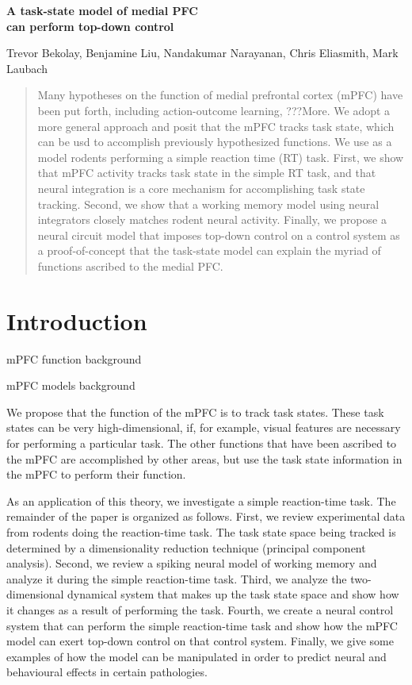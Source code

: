 \documentclass[12pt]{article}
\title{}
\date{}
\author{}
\begin{document}
\begin{center} \begin{Large}
  \textbf{A task-state model of medial PFC \\ can perform top-down
    control}
\end{Large} \end{center}

\begin{center}
  Trevor Bekolay, Benjamine Liu, Nandakumar Narayanan, Chris
  Eliasmith, Mark Laubach
\end{center}

\begin{abstract}
  Many hypotheses on the function of medial prefrontal cortex (mPFC)
  have been put forth,
  including action-outcome learning, ???More.
  We adopt a more general approach and posit that
  the mPFC tracks task state,
  which can be usd to accomplish previously hypothesized functions.
  We use as a model rodents performing a simple reaction time (RT) task.
  First, we show that mPFC activity
  tracks task state in the simple RT task,
  and that neural integration is a core mechanism
  for accomplishing task state tracking.
  Second, we show that a working memory model
  using neural integrators closely matches
  rodent neural activity.
  Finally, we propose a neural circuit model
  that imposes top-down control on a control system
  as a proof-of-concept that the task-state model
  can explain the myriad of functions ascribed
  to the medial PFC.
\end{abstract}

\section{Introduction}

mPFC function background

mPFC models background

We propose that the function of the mPFC is to
track task states.
These task states can be very high-dimensional,
if, for example, visual features are necessary
for performing a particular task.
The other functions that have been ascribed
to the mPFC are accomplished
by other areas, but use the task state
information in the mPFC to perform their function.

As an application of this theory,
we investigate a simple reaction-time task.
The remainder of the paper is organized as follows.
First, we review experimental data from rodents
doing the reaction-time task.
The task state space being tracked is determined
by a dimensionality reduction technique
(principal component analysis).
Second, we review a spiking neural model
of working memory and
analyze it during the simple reaction-time task.
Third, we analyze the two-dimensional dynamical system
that makes up the task state space and
show how it changes as a result of performing the task.
Fourth, we create a neural control system
that can perform the simple reaction-time task
and show how the mPFC model can exert top-down control
on that control system.
Finally, we give some examples of how the model
can be manipulated in order to predict
neural and behavioural effects in certain pathologies.
\end{document}
